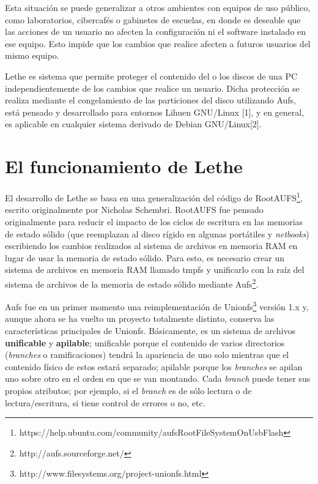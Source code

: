 \documentclass[final,narroweqnarray,inline,twoside]{ieee}
\newcommand{\itref}[1]{[{#1}]}
\begin{document}
Esta situación se puede generalizar a otros ambientes con equipos de uso público, como laboratorios, cibercafés o gabinetes
de escuelas, en donde es deseable que las acciones de un usuario no afecten la configuración ni el software instalado en ese
equipo. Esto impide que los cambios que realice afecten a futuros usuarios del mismo equipo.

Lethe es sistema que permite proteger el contenido del o los discos de una PC independientemente de los cambios que realice
un usuario. Dicha protección se realiza mediante el congelamiento de las particiones del disco utilizando Aufs, está pensado
y desarrollado para entornos Lihuen GNU/Linux \itref{1}, y en general, es aplicable en cualquier sistema derivado de Debian
GNU/Linux\itref{2}.

\section{El funcionamiento de Lethe}
El desarrollo de Lethe se basa en una generalización del código de RootAUFS\footnote
{https://help.ubuntu.com/community/aufsRootFileSystemOnUsbFlash}, escrito originalmente por Nicholas Schembri. RootAUFS fue
pensado originalmente para reducir el impacto de los ciclos de escritura en las memorias de estado sólido (que reemplazan al
disco rígido en algunas portátiles y \textit{netbooks}) escribiendo los cambios realizados al sistema de archivos en memoria
RAM en lugar de usar la memoria de estado sólido. Para esto, es necesario crear un sistema de archivos en memoria RAM llamado
tmpfs y unificarlo con la raíz del sistema de archivos de la memoria de estado sólido mediante
Aufs\footnote{http://aufs.sourceforge.net/}.

Aufs fue en un primer momento una reimplementación de Unionfs\footnote{http://www.filesystems.org/project-unionfs.html}
versión 1.x y, aunque ahora se ha vuelto un proyecto totalmente distinto, conserva las características principales de
Unionfs. Básicamente, es un sistema de archivos \textbf{unificable} y \textbf{apilable}; unificable porque el contenido de
varios directorios (\textit{branches} o ramificaciones) tendrá la apariencia de uno solo mientras que el contenido físico de
estos estará separado; apilable porque los \textit{branches} se apilan uno sobre otro en el orden en que se van montando.
Cada \textit{branch} puede tener sus propios atributos; por ejemplo, si el \textit{branch} es de sólo lectura o de
lectura/escritura, si tiene control de errores o no, etc.
\end{document}
